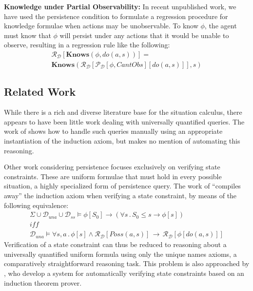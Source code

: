 \textbf{Knowledge under Partial Observability:} In recent unpublished
work, we have used the persistence condition to formulate a regression
procedure for knowledge formulae when actions may be unobservable.
To know $\phi$, the agent must know that $\phi$ will persist under
any actions that it would be unable to observe, resulting in a regression
rule like the following:\begin{multline*}
\mathcal{R}_{\mathcal{D}}[\mathbf{Knows}(\phi,do(a,s))]=\\
\mathbf{Knows}(\mathcal{R}_{\mathcal{D}}[\mathcal{P}_{\mathcal{D}}[\phi,CantObs][do(a,s)]],s)\end{multline*}



\subsection{Related Work}

While there is a rich and diverse literature base for the situation
calculus, there appears to have been little work dealing with universally
quantified queries. The work of \citet{Reiter93proving} shows how
to handle such queries manually using an appropriate instantiation
of the induction axiom, but makes no mention of automating this reasoning.

Other work considering persistence focuses exclusively on verifying
state constraints. These are uniform formulae that must hold in every
possible situation, a highly specialized form of persistence query.
The work of \citet{Lin94-StateConstraints} {}``compiles away''
the induction axiom when verifying a state constraint, by means of
the following equivalence:\begin{gather*}
\Sigma\cup\mathcal{D}_{una}\cup\mathcal{D}_{ss}\models\phi[S_{0}]\rightarrow\left(\forall s\,.\, S_{0}\leq s\rightarrow\phi[s]\right)\\
\mathit{iff}\\
\mathcal{D}_{una}\models\forall s,a\,.\,\phi[s]\wedge\mathcal{R}_{\mathcal{D}}[Poss(a,s)]\,\rightarrow\,\mathcal{R}_{\mathcal{D}}[\phi[do(a,s)]]\end{gather*}
 Verification of a state constraint can thus be reduced to reasoning
about a universally quantified uniform formula using only the unique
names axioms, a comparatively straightforward reasoning task. This
problem is also approached by \citet{bertossi96automating}, who develop
a system for automatically verifying state constraints based on an
induction theorem prover.

